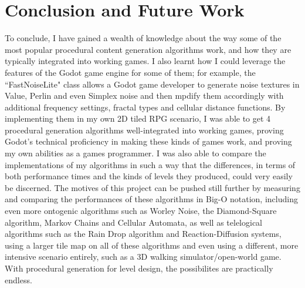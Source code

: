 \chapter{Conclusion and Future Work} \label{Conclusion}


To conclude, I have gained a wealth of knowledge about the way some of the most popular procedural content generation algorithms work, and how they are typically integrated into working games. I also learnt how I could leverage the features of the Godot game engine for some of them; for example, the ``FastNoiseLite" class allows a Godot game developer to generate noise textures in Value, Perlin and even Simplex noise and then mpdify them accordingly with additional frequency settings, fractal types and cellular distance functions. By implementing them in my own 2D tiled RPG scenario, I was able to get 4 procedural generation algorithms well-integrated into working games, proving Godot's technical proficiency in making these kinds of games work, and proving my own abilities as a games programmer. I was also able to compare the implementations of my algorithms in such a way that the differences, in terms of both performance times and the kinds of levels they produced, could very easily be discerned. The motives of this project can be pushed still further by measuring and comparing the performances of these algorithms in Big-O notation, including even more ontogenic algorithms such as Worley Noise, the Diamond-Square algorithm, Markov Chains and Cellular Automata, as well as telelogical algorithms such as the Rain Drop algorithm and Reaction-Diffusion systems, using a larger tile map on all of these algorithms and even using a different, more intensive scenario entirely, such as a 3D walking simulator/open-world game. With procedural generation for level design, the possibilites are practically endless.